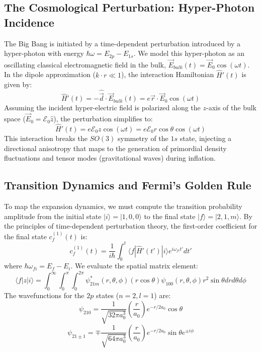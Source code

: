 \subsection{The Cosmological Perturbation: Hyper-Photon Incidence}
The Big Bang is initiated by a time-dependent perturbation introduced by a hyper-photon with energy $\hbar\omega = E_{2p} - E_{1s}$. We model this hyper-photon as an oscillating classical electromagnetic field in the bulk, $\vec{E}_{bulk}(t) = \vec{E}_0 \cos(\omega t)$. 
In the dipole approximation ($k \cdot r \ll 1$), the interaction Hamiltonian $\hat{H}'(t)$ is given by:
\begin{equation}
\hat{H}'(t) = -\hat{\vec{d}} \cdot \vec{E}_{bulk}(t) = e \vec{r} \cdot \vec{E}_0 \cos(\omega t)
\end{equation}
Assuming the incident hyper-electric field is polarized along the $z$-axis of the bulk space ($\vec{E}_0 = \mathcal{E}_0 \hat{z}$), the perturbation simplifies to:
\begin{equation}
\hat{H}'(t) = e \mathcal{E}_0 z \cos(\omega t) = e \mathcal{E}_0 r \cos\theta \cos(\omega t)
\end{equation}
This interaction breaks the $SO(3)$ symmetry of the $1s$ state, injecting a directional anisotropy that maps to the generation of primordial density fluctuations and tensor modes (gravitational waves) during inflation.

\subsection{Transition Dynamics and Fermi's Golden Rule}
To map the expansion dynamics, we must compute the transition probability amplitude from the initial state $|i\rangle = |1,0,0\rangle$ to the final state $|f\rangle = |2,1,m\rangle$. By the principles of time-dependent perturbation theory, the first-order coefficient for the final state $c_f^{(1)}(t)$ is:
\begin{equation}
c_f^{(1)}(t) = \frac{1}{i\hbar} \int_0^t \langle f | \hat{H}'(t') | i \rangle e^{i\omega_{fi}t'} dt'
\end{equation}
where $\hbar\omega_{fi} = E_f - E_i$. We evaluate the spatial matrix element:
\begin{equation}
\langle f | z | i \rangle = \int_0^\infty \int_0^\pi \int_0^{2\pi} \psi_{21m}^*(r,\theta,\phi) (r \cos\theta) \psi_{100}(r,\theta,\phi) r^2 \sin\theta dr d\theta d\phi
\end{equation}
The wavefunctions for the $2p$ states ($n=2, l=1$) are:
\begin{equation}
\psi_{210} = \frac{1}{\sqrt{32\pi a_0^3}} \left(\frac{r}{a_0}\right) e^{-r/2a_0} \cos\theta
\end{equation}
\begin{equation}
\psi_{21\pm1} = \mp \frac{1}{\sqrt{64\pi a_0^3}} \left(\frac{r}{a_0}\right) e^{-r/2a_0} \sin\theta e^{\pm i\phi}
\end{equation}

